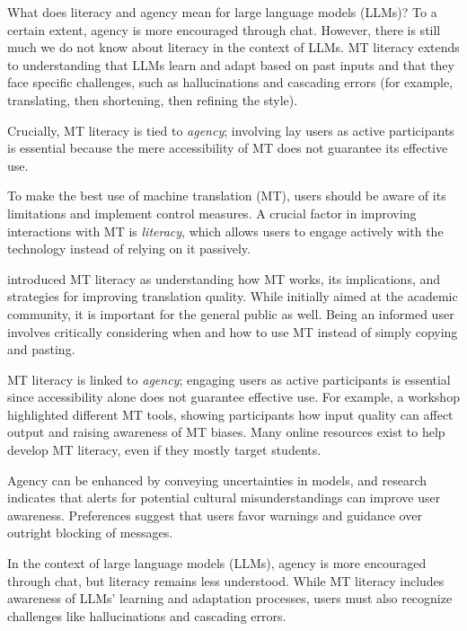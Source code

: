 What does literacy and agency mean for large language models (LLMs)? To a certain extent, agency is more encouraged through chat. However, there is still much we do not know about literacy in the context of LLMs. MT literacy extends to understanding that LLMs learn and adapt based on past inputs and that they face specific challenges, such as hallucinations and cascading errors (for example, translating, then shortening, then refining the style).


Crucially, MT literacy is tied to \textit{agency}; involving lay users as active participants is essential because the mere accessibility of MT does not guarantee its effective use.


To make the best use of machine translation (MT), users should be aware of its limitations and implement control measures. A crucial factor in improving interactions with MT is \textit{literacy}, which allows users to engage actively with the technology instead of relying on it passively. 

\citet{bowker2019towards} introduced MT literacy as understanding how MT works, its implications, and strategies for improving translation quality. While initially aimed at the academic community, it is important for the general public as well. Being an informed user involves critically considering when and how to use MT instead of simply copying and pasting.

MT literacy is linked to \textit{agency}; engaging users as active participants is essential since accessibility alone does not guarantee effective use. For example, a workshop highlighted different MT tools, showing participants how input quality can affect output and raising awareness of MT biases. Many online resources exist to help develop MT literacy, even if they mostly target students.

Agency can be enhanced by conveying uncertainties in models, and research indicates that alerts for potential cultural misunderstandings can improve user awareness. Preferences suggest that users favor warnings and guidance over outright blocking of messages.

In the context of large language models (LLMs), agency is more encouraged through chat, but literacy remains less understood. While MT literacy includes awareness of LLMs' learning and adaptation processes, users must also recognize challenges like hallucinations and cascading errors.
















